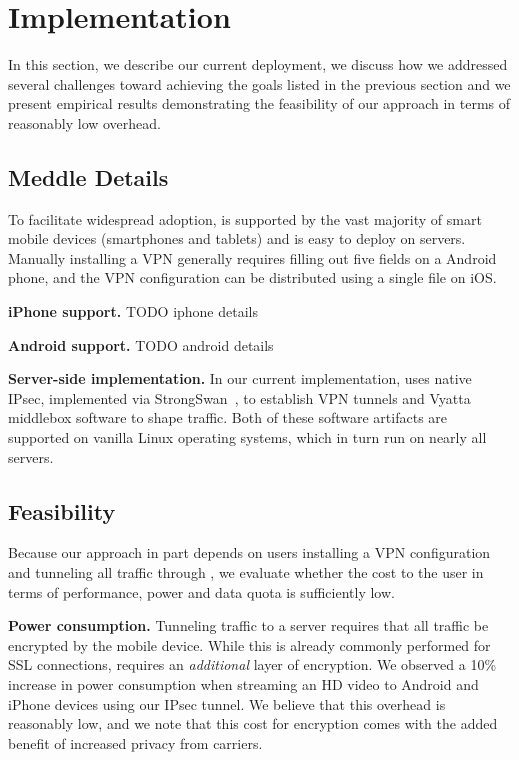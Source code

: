 \section{Implementation}
In this section, we describe our current deployment, we discuss how we addressed several 
challenges toward achieving the goals listed in the previous section and 
we present empirical results demonstrating the feasibility of our approach 
in terms of reasonably low overhead. 

\subsection{Meddle Details}
To facilitate widespread adoption, \meddle is
supported by the vast majority of smart mobile devices (smartphones and tablets) and 
is easy to deploy on servers. Manually installing a VPN generally requires filling out five
fields on a Android phone, and the VPN configuration can be
distributed using a single file on iOS. 

\noindent\textbf{iPhone support.} TODO iphone details

\noindent\textbf{Android support.} TODO android details

\noindent\textbf{Server-side implementation.} In our current implementation, \meddle 
uses native IPsec, implemented via StrongSwan~\cite{strongswan}, to establish VPN tunnels 
and Vyatta middlebox software to shape
traffic. Both of these software artifacts are supported on vanilla
Linux operating systems, which in turn run on nearly all servers. 
   
\subsection{Feasibility}
\label{subsec:cost}
Because our approach in part depends on users installing a VPN configuration and tunneling all traffic through \meddle, we evaluate whether the cost to the user in terms of performance, power and data quota is sufficiently low.

\noindent\textbf{Power consumption.} Tunneling traffic to a \meddle
server requires that all traffic be encrypted by the mobile
device. While this is already commonly performed for SSL connections,
\meddle requires an \emph{additional} layer of encryption. We observed
a 10\% increase in power consumption when streaming an HD video to
Android and iPhone devices using our IPsec tunnel. We believe that this 
overhead is reasonably low, and we note that this cost for encryption comes with the added benefit of increased 
privacy from carriers.

